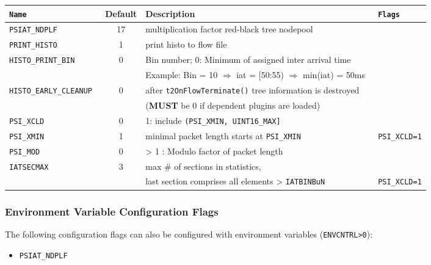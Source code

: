 \documentclass[documentation]{subfiles}
\begin{document}
\begin{longtable}{>{\tt\small}lcl>{\tt\small}l}
    \toprule
    {\bf Name} & {\bf Default} & {\bf Description} & {\bf Flags} \\
    \midrule\endhead%
    PSIAT\_NDPLF             & 17 & multiplication factor red-black tree nodepool                               & \\
    PRINT\_HISTO             & 1  & print histo to flow file                                                    & \\
    HISTO\_PRINT\_BIN        & 0  & Bin number; 0: Minimum of assigned inter arrival time                       & \\
                             &    & Example: Bin = 10 $\Rightarrow$ iat = [50:55) $\Rightarrow$ min(iat) = 50ms & \\
    HISTO\_EARLY\_CLEANUP    & 0  & after {\tt t2OnFlowTerminate()} tree information is destroyed               & \\
                             &    & ({\bf MUST} be 0 if dependent plugins are loaded)                           & \\
    PSI\_XCLD                & 0  & 1: include {\tt (PSI\_XMIN, UINT16\_MAX]}                                   & \\
    PSI\_XMIN                & 1  & minimal packet length starts at {\tt PSI\_XMIN}                             & PSI\_XCLD=1\\
    PSI\_MOD                 & 0  & > 1 : Modulo factor of packet length                                        & \\
    IATSECMAX                & 3  & max \# of sections in statistics,                                           & \\
                             &    & last section comprises all elements > {\tt IATBINBuN}                       & PSI\_XCLD=1\\
    \bottomrule
\end{longtable}

\subsubsection{Environment Variable Configuration Flags}
The following configuration flags can also be configured with environment variables ({\tt ENVCNTRL>0}):
\begin{itemize}
    \item {\tt PSIAT\_NDPLF}
\end{itemize}
\end{document}
